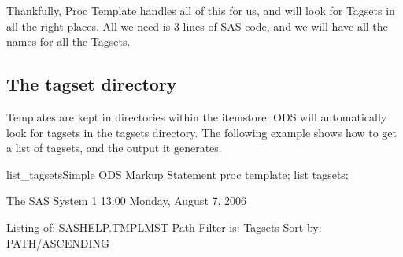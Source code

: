 Thankfully, Proc Template handles all of this for us, and will look for Tagsets
in all the right places.  All we need is 3 lines of SAS code, and we will have
all the names for all the Tagsets.


\subsection{The tagset directory}
Templates are kept in directories within the itemstore.  ODS will automatically look for 
tagsets in the tagsets directory.  The following example shows how to get a list
of tagsets, and the output it generates.

\begin{fvcode}{list_tagsets}{Simple ODS Markup Statement}
       proc template;
           list tagsets;

                               The SAS System                               1
                                                  13:00 Monday, August 7, 2006

                Listing of: SASHELP.TMPLMST
                Path Filter is: Tagsets
                Sort by: PATH/ASCENDING
 

\end{fvcode}
